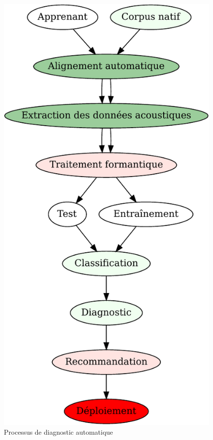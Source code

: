 \documentclass[
  10pt,
]{article}
\begin{document}
\begin{figure}
 
 {\centering \includegraphics[width=468px,height=0.5\textheight]{index_files/figure-latex/diagno0-1} 
 
 }
 
 \caption{Processus de diagnostic automatique}\label{fig:diagno0}
 \end{figure}
\end{document}
